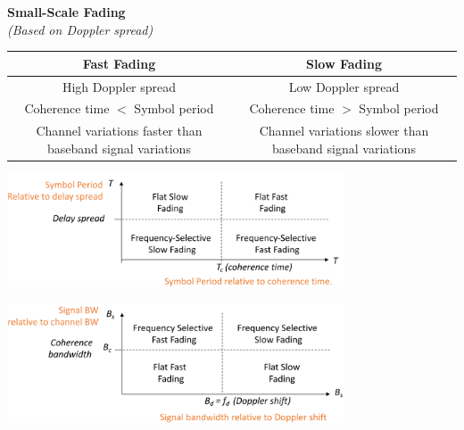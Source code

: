 \begin{center}
\textbf{Small-Scale Fading} \\
\textit{(Based on Doppler spread)}

\bigskip

\begin{tabular}{|c|c|}
\hline
\textbf{Fast Fading} & \textbf{Slow Fading} \\ \hline
High Doppler spread & Low Doppler spread \\
Coherence time $<$ Symbol period & Coherence time $>$ Symbol period \\
Channel variations faster than baseband signal variations & Channel variations slower than baseband signal variations \\ \hline
\end{tabular}
\end{center}

\bigskip

\begin{center}
    \includegraphics[width=0.75\textwidth]{imgs/recap_ssf1.png}
\end{center}
\begin{center}
    \includegraphics[width=0.75\textwidth]{imgs/recap_ssf2.png}
\end{center}